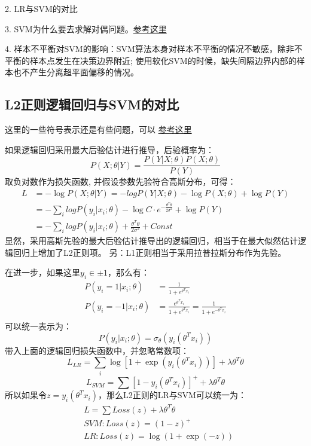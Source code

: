 2. LR与SVM的对比

3. SVM为什么要去求解对偶问题。\href{https://shomy.top/2017/02/17/svm-02-dual/}{参考这里}

4. 样本不平衡对SVM的影响：SVM算法本身对样本不平衡的情况不敏感，除非不平衡的样本点发生在决策边界附近;
使用软化SVM的时候，缺失间隔边界内部的样本也不产生分离超平面偏移的情况。

\subsection{L2正则逻辑回归与SVM的对比}
这里的一些符号表示还是有些问题，可以
\href{http://weirping.coding.me/blog/Bayesian-Probabilities-in-ML.html}{参考这里}

如果逻辑回归采用最大后验估计进行推导，后验概率为：
\begin{equation*}
    P(X;\theta|Y) = \frac{P(Y|X;\theta)P(X;\theta)}{P(Y)}
\end{equation*}
取负对数作为损失函数, 并假设参数先验符合高斯分布，可得：
\begin{align*}
    L &= -\log P(X;\theta|Y) = -log P(Y|X;\theta) - \log P(X;\theta) + \log P(Y) \\
    &= -\sum_i log P(y_i|x_i;\theta) - \log C\cdot e^{-\frac{\theta^T\theta}{2\sigma^2}} + \log P(Y) \\
    &= -\sum_i log P(y_i|x_i;\theta) + \frac{\theta^T\theta}{2\sigma^2} + Const
\end{align*}
显然，采用高斯先验的最大后验估计推导出的逻辑回归，相当于在最大似然估计逻辑回归上增加了L2正则项。
另：L1正则相当于采用拉普拉斯分布作为先验。

在进一步，如果这里$y_i \in \pm 1$，那么有：
\begin{align*}
    P(y_i=1 |x_i;\theta) &= \frac{1}{1+e^{\theta^T x_i}} \\
    P(y_i=-1|x_i;\theta) &= \frac{e^{\theta^T x_i}}{1+e^{\theta^T x_i}} = \frac{1}{1+e^{-\theta^T x_i}}\\
\end{align*}
可以统一表示为：
\begin{equation*}
    P(y_i|x_i;\theta) = \sigma_\theta(y_i(\theta^T x_i))
\end{equation*}
带入上面的逻辑回归损失函数中，并忽略常数项：
\begin{equation*}
    L_{LR} = \sum_i \log [1+\exp(y_i(\theta^T x_i))] + \lambda \theta^T\theta
\end{equation*}
\begin{equation*}
    L_{SVM} = \sum \left[1 - y_i(\theta^T x_i)\right]^+ + \lambda \theta^T\theta
\end{equation*}
所以如果令$z = y_i(\theta^T x_i)$，那么L2正则的LR与SVM可以统一为：
\begin{align*}
    & L = \sum Loss(z) + \lambda \theta^T\theta \\
    & SVM: Loss(z) = (1-z)^+ \\
    & LR: Loss(z) = \log (1+\exp(-z))
\end{align*}

